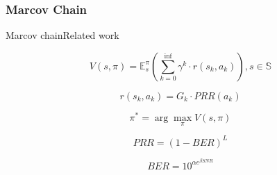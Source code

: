 \subsubsection{Marcov Chain}

\begin{frame}{Marcov chain}{Related work}

\begin{flushleft}
\begin{equation}
V(s, \pi)=\mathbb{E}_{s}^{\pi}\left(\sum_{k=0}^{\mathrm{inf}} \gamma^{k} \cdot r\left(s_{k}, a_{k}\right)\right), s \in \mathbb{S}
\end{equation}

\begin{equation}
r\left(s_{k}, a_{k}\right)=G_{k} \cdot P R R\left(a_{k}\right)
\end{equation}

\begin{equation}
\pi^{*}=\arg \max _{\pi} V(s, \pi)
\end{equation}


\begin{equation}
PRR=(1-BER)^{L}
\end{equation}

\begin{equation}
BER=10^{\alpha e^{\beta SNR}}
\end{equation}

\end{flushleft}

\end{frame}

